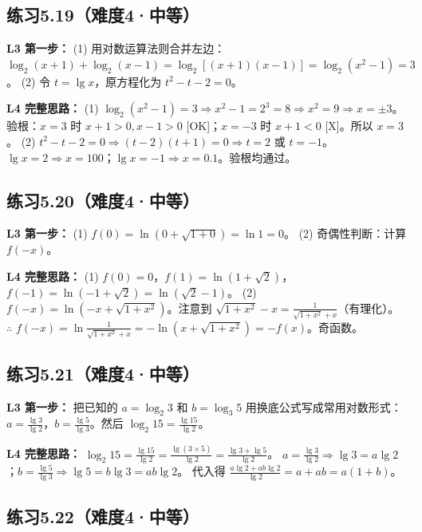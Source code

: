 \subsection*{练习5.19（难度4·中等）}

\textbf{L3 第一步：}
(1) 用对数运算法则合并左边：
\(\log_2(x+1) + \log_2(x-1) = \log_2[(x+1)(x-1)] = \log_2(x^2 - 1) = 3\)。
(2) 令 \(t = \lg x\)，原方程化为 \(t^2 - t - 2 = 0\)。

\textbf{L4 完整思路：}
(1) \(\log_2(x^2 - 1) = 3 \Rightarrow x^2 - 1 = 2^3 = 8 \Rightarrow x^2 = 9 \Rightarrow x = \pm 3\)。
验根：\(x=3\) 时 \(x+1>0, x-1>0\) [OK]；\(x=-3\) 时 \(x+1<0\) [X]。所以 \(x=3\)。
(2) \(t^2 - t - 2 = 0 \Rightarrow (t-2)(t+1)=0 \Rightarrow t=2\) 或 \(t=-1\)。
\(\lg x = 2 \Rightarrow x = 100\)；\(\lg x = -1 \Rightarrow x = 0.1\)。验根均通过。

\subsection*{练习5.20（难度4·中等）}

\textbf{L3 第一步：}
(1) \(f(0) = \ln(0 + \sqrt{1+0}) = \ln 1 = 0\)。
(2) 奇偶性判断：计算 \(f(-x)\)。

\textbf{L4 完整思路：}
(1) \(f(0)=0\)，\(f(1)=\ln(1+\sqrt{2})\)，\(f(-1)=\ln(-1+\sqrt{2}) = \ln(\sqrt{2}-1)\)。
(2) \(f(-x) = \ln(-x + \sqrt{1+x^2})\)。注意到 \(\sqrt{1+x^2} - x = \frac{1}{\sqrt{1+x^2}+x}\)（有理化）。
\(\therefore\) \(f(-x) = \ln\frac{1}{\sqrt{1+x^2}+x} = -\ln(x+\sqrt{1+x^2}) = -f(x)\)。奇函数。

\subsection*{练习5.21（难度4·中等）}

\textbf{L3 第一步：}
把已知的 \(a = \log_2 3\) 和 \(b = \log_3 5\) 用换底公式写成常用对数形式：
\(a = \frac{\lg 3}{\lg 2}\)，\(b = \frac{\lg 5}{\lg 3}\)。然后 \(\log_2 15 = \frac{\lg 15}{\lg 2}\)。

\textbf{L4 完整思路：}
\(\log_2 15 = \frac{\lg 15}{\lg 2} = \frac{\lg(3 \times 5)}{\lg 2} = \frac{\lg 3 + \lg 5}{\lg 2}\)。
\(a = \frac{\lg 3}{\lg 2} \Rightarrow \lg 3 = a \lg 2\)；\(b = \frac{\lg 5}{\lg 3} \Rightarrow \lg 5 = b \lg 3 = ab \lg 2\)。
代入得 \(\frac{a\lg 2 + ab\lg 2}{\lg 2} = a + ab = a(1+b)\)。

\subsection*{练习5.22（难度4·中等）}

